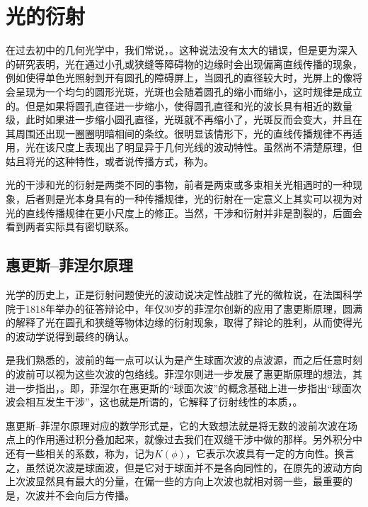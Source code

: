 \section{光的衍射}
\label{sec:光的衍射}
在过去初中的几何光学中，我们常说，。这种说法没有太大的错误，但是更为深入的研究表明，光在通过小孔或狭缝等障碍物的边缘时会出现偏离直线传播的现象，例如使得单色光照射到开有圆孔的障碍屏上，当圆孔的直径较大时，光屏上的像将会呈现为一个均匀的圆形光斑，光斑也会随着圆孔的缩小而缩小，这时规律是成立的。但是如果将圆孔直径进一步缩小，使得圆孔直径和光的波长具有相近的数量级，此时如果进一步缩小圆孔直径，光斑就不再缩小了，光斑反而会变大，并且在其周围还出现一圈圈明暗相间的条纹。很明显该情形下，光的直线传播规律不再适用，光在该尺度上表现出了明显异于几何光线的波动特性。虽然尚不清楚原理，但姑且将光的这种特性，或者说传播方式，称为。

光的干涉和光的衍射是两类不同的事物，前者是两束或多束相关光相遇时的一种现象，后者则是光本身具有的一种传播规律，光的衍射在一定意义上其实可以视为对光的直线传播规律在更小尺度上的修正。当然，干涉和衍射并非是割裂的，后面会看到两者实际具有密切联系。

\subsection{惠更斯--菲涅尔原理}
\label{subsec:惠更斯--菲涅尔原理}
光学的历史上，正是衍射问题使光的波动说决定性战胜了光的微粒说，在法国科学院于1818年举办的征答辩论中，年仅30岁的菲涅尔创新的应用了惠更斯原理，圆满的解释了光在圆孔和狭缝等物体边缘的衍射现象，取得了辩论的胜利，从而使得光的波动学说得到最终的确认。

是我们熟悉的，波前的每一点可以认为是产生球面次波的点波源，而之后任意时刻的波前可以视为这些次波的包络线。菲涅尔则进一步发展了惠更斯原理的想法，其进一步指出，。即，菲涅尔在惠更斯的“球面次波”的概念基础上进一步指出“球面次波会相互发生干涉”，这也就是所谓的，它解释了衍射线性的本质，。

惠更斯--菲涅尔原理对应的数学形式是，它的大致想法就是将无数的波前次波在场点上的作用通过积分叠加起来，就像过去我们在双缝干涉中做的那样。另外积分中还有一些相关的系数，称为，记为$K(\phi)$，它表示次波具有一定的方向性。换言之，虽然说次波是球面波，但是它对于球面并不是各向同性的，在原先的波动方向上次波显然具有最大的分量，在偏一些的方向上次波也就相对弱一些，最重要的是，次波并不会向后方传播。

